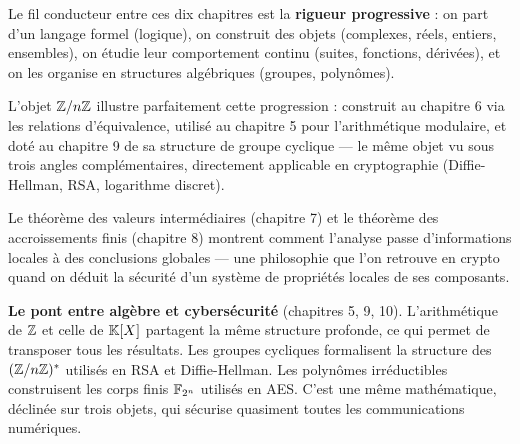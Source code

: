 \begin{intuitionbox}
Le fil conducteur entre ces dix chapitres est la \textbf{rigueur progressive} : on part d'un langage formel (logique), on construit des objets (complexes, réels, entiers, ensembles), on étudie leur comportement continu (suites, fonctions, dérivées), et on les organise en structures algébriques (groupes, polynômes).

L'objet $\mathbb{Z}/n\mathbb{Z}$ illustre parfaitement cette progression : construit au chapitre 6 via les relations d'équivalence, utilisé au chapitre 5 pour l'arithmétique modulaire, et doté au chapitre 9 de sa structure de groupe cyclique --- le même objet vu sous trois angles complémentaires, directement applicable en cryptographie (Diffie-Hellman, RSA, logarithme discret).

Le théorème des valeurs intermédiaires (chapitre 7) et le théorème des accroissements finis (chapitre 8) montrent comment l'analyse passe d'informations locales à des conclusions globales --- une philosophie que l'on retrouve en crypto quand on déduit la sécurité d'un système de propriétés locales de ses composants.

\textbf{Le pont entre algèbre et cybersécurité} (chapitres 5, 9, 10). L'arithmétique de $\mathbb{Z}$ et celle de $\mathbb{K}[X]$ partagent la même structure profonde, ce qui permet de transposer tous les résultats. Les groupes cycliques formalisent la structure des $(\mathbb{Z}/n\mathbb{Z})^*$ utilisés en RSA et Diffie-Hellman. Les polynômes irréductibles construisent les corps finis $\mathbb{F}_{2^n}$ utilisés en AES. C'est une même mathématique, déclinée sur trois objets, qui sécurise quasiment toutes les communications numériques.
\end{intuitionbox}


